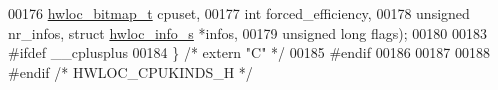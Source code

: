 \begin{DoxyCode}
00176                         \hyperlink{a00205_gaa3c2bf4c776d603dcebbb61b0c923d84}{hwloc\_bitmap\_t} cpuset,
00177                         \textcolor{keywordtype}{int} forced\_efficiency,
00178                         \textcolor{keywordtype}{unsigned} nr\_infos, \textcolor{keyword}{struct} \hyperlink{a00286}{hwloc\_info\_s} *infos,
00179                         \textcolor{keywordtype}{unsigned} \textcolor{keywordtype}{long} flags);
00180 
00183 \textcolor{preprocessor}{#ifdef \_\_cplusplus}
00184 \} \textcolor{comment}{/* extern "C" */}
00185 \textcolor{preprocessor}{#endif}
00186 
00187 
00188 \textcolor{preprocessor}{#endif }\textcolor{comment}{/* HWLOC\_CPUKINDS\_H */}\textcolor{preprocessor}{}
\end{DoxyCode}
